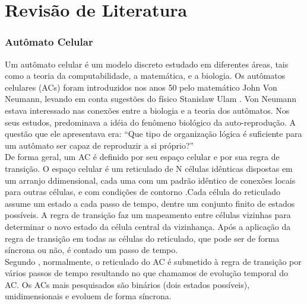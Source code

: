
\chapter{Revisão de Literatura}
\label{chap:revisaoliteratura}

\subsection{Autômato Celular}
Um autômato celular é um modelo discreto estudado em diferentes áreas, tais como a
teoria da computabilidade, a matemática, e a biologia. Os autômatos celulares (ACs) foram
introduzidos nos anos 50 pelo matemático John Von Neumann, levando em conta sugestões
do físico Stanislaw Ulam \cite{wolfram1984a}. Von Neumann estava interessado nas conexões
entre a biologia e a teoria dos autômatos. Nos seus estudos, predominava a idéia do fenômeno
biológico da auto-reprodução. A questão que ele apresentava era: “Que tipo de organização
lógica é suficiente para um autômato ser capaz de reproduzir a si próprio?” \cite{monotonicidadedeclividade}
\\

De forma geral, um AC é definido por seu espaço celular e por sua regra de transição.
O espaço celular é um reticulado de N células idênticas dispostas em um arranjo ddimensional,
cada uma com um padrão idêntico de conexões locais para outras células, e com
condições de contorno \cite{acsaspectosdimanicosecomputacionais}.Cada célula do reticulado assume um estado a cada
passo de tempo, dentre um conjunto finito de estados possíveis. A regra de transição faz um
mapeamento entre células vizinhas para determinar o novo estado da célula central da
vizinhança. Após a aplicação da regra de transição em todas as células do reticulado, que pode
ser de forma síncrona ou não, é contado um passo de tempo.\\

Segundo , normalmente, o reticulado do
AC é submetido à regra de transição por vários passos de tempo resultando no que chamamos
de evolução temporal do AC.
Os ACs mais pesquisados são binários (dois estados possíveis),
unidimensionais e evoluem de forma síncrona.





